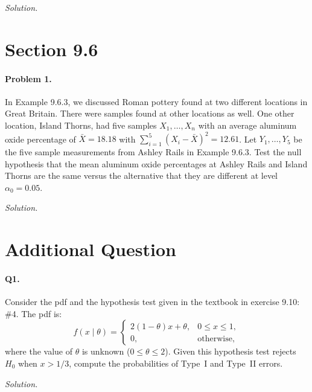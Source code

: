 \documentclass[11pt]{article}
\newcommand{\workspace}[1]{%
    \par\vspace{0.4em}\textit{Solution.}\vspace{#1}\par
}
\begin{document}
\workspace{16cm}

\newpage

\section*{Section 9.6}

\paragraph{Problem 1.}
In Example 9.6.3, we discussed Roman pottery found at two different locations in
Great Britain. There were samples found at other locations as well. One other
location, Island Thorns, had five samples $X_1, \dots, X_n$ with an average
aluminum oxide percentage of $\bar{X} = 18.18$ with
$\sum_{i=1}^{5}(X_i - \bar{X})^2 = 12.61$. Let $Y_1, \dots, Y_5$ be the five sample
measurements from Ashley Rails in Example 9.6.3. Test the null hypothesis that the
mean aluminum oxide percentages at Ashley Rails and Island Thorns are the same
versus the alternative that they are different at level $\alpha_0 = 0.05$.

\workspace{18cm}

\newpage

\section*{Additional Question}

\paragraph{Q1.}
Consider the pdf and the hypothesis test given in the textbook in exercise 9.10: \#4.
The pdf is:
\[
    f(x \mid \theta) =
    \begin{cases}
        2(1-\theta)x + \theta, & 0 \leq x \leq 1, \\
        0, & \text{otherwise},
    \end{cases}
\]
where the value of $\theta$ is unknown ($0 \leq \theta \leq 2$). Given this
hypothesis test rejects $H_0$ when $x > 1/3$, compute the probabilities of Type~I
and Type~II errors.

\workspace{16cm}
\end{document}
